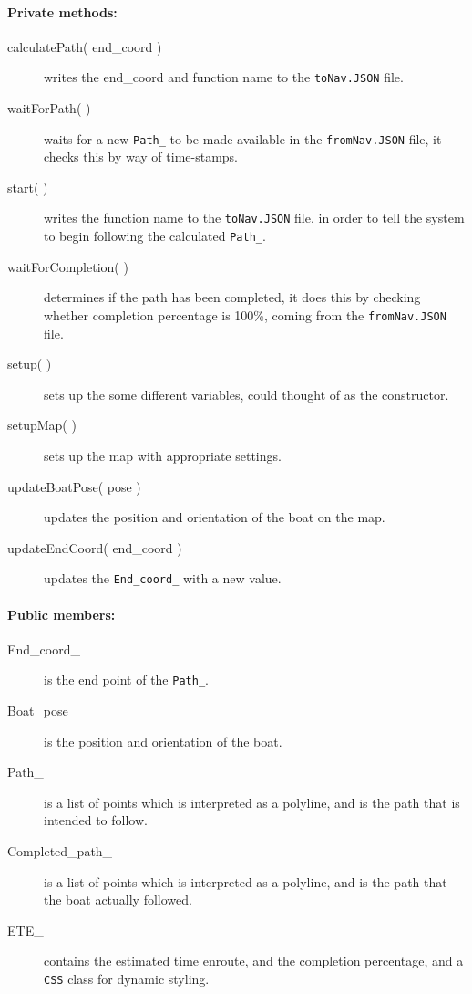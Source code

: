 \paragraph{Private methods:}
\begin{adjustwidth}{2.5em}{0pt}\begin{description}
		\item [calculatePath( end_coord )] writes the end_coord and function name to the \texttt{toNav.JSON} file. 
		\item [waitForPath( )] waits for a new \texttt{Path_} to be made available in the \texttt{fromNav.JSON} file, it checks this by way of time-stamps.
		\item [start( )] writes the function name to the \texttt{toNav.JSON} file, in order to tell the system to begin following the calculated \texttt{Path_}.
		\item [waitForCompletion( )] determines if the path has been completed, it does this by checking whether completion percentage is 100\%, coming from the \texttt{fromNav.JSON} file.
		\item [setup( )] sets up the some different variables, could thought of as the constructor.
		\item [setupMap( )] sets up the map with appropriate settings.
		\item [updateBoatPose( pose )] updates the position and orientation of the boat on the map.
		\item [updateEndCoord( end_coord )] updates the \texttt{End_coord_} with a new value.
\end{description}\end{adjustwidth}


\paragraph{Public members:}
\begin{adjustwidth}{2.5em}{0pt}\begin{description}
		\item [End_coord_] is the end point of the \texttt{Path_}.
		\item [Boat_pose_] is the position and orientation of the boat.
		\item [Path_] is a list of points which is interpreted as a polyline, and is the path that is intended to follow.
		\item[Completed_path_] is a list of points which is interpreted as a polyline, and is the path that the boat actually followed.
		\item[ETE_] contains the estimated time enroute, and the completion percentage, and a \texttt{CSS} class for dynamic styling. 
\end{description}\end{adjustwidth}


